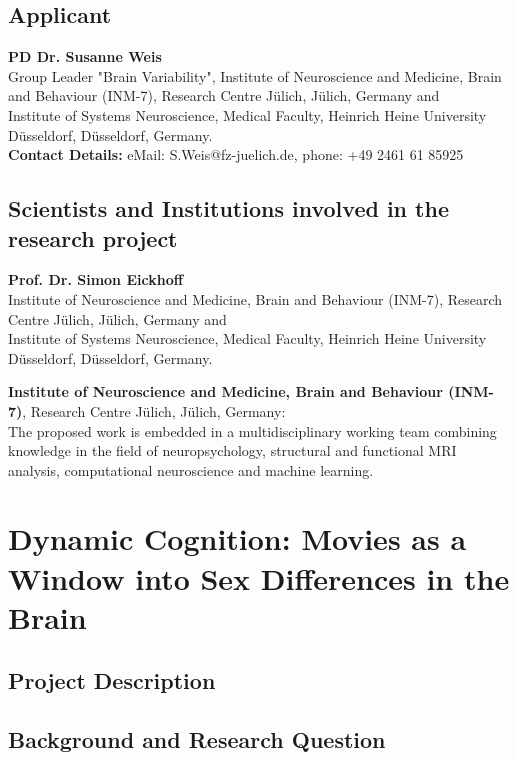 \documentclass[11pt,a4paper]{article}
\begin{document}
\subsection*{Applicant} 
\vspace{1ex}
\textbf{PD Dr. Susanne Weis}\\
Group Leader "Brain Variability", Institute of Neuroscience and Medicine, Brain and Behaviour (INM-7), Research Centre Jülich, Jülich, Germany and \\
Institute of Systems Neuroscience, Medical Faculty, Heinrich Heine University Düsseldorf, Düsseldorf, Germany. \\
\textbf{Contact Details:} eMail: S.Weis@fz-juelich.de, phone: +49 2461 61 85925\\

\subsection*{Scientists and Institutions involved in the research project}
\vspace{1ex}
\textbf{Prof. Dr. Simon Eickhoff}\\
Institute of Neuroscience and Medicine, Brain and Behaviour (INM-7), Research Centre Jülich, Jülich, Germany and \\
Institute of Systems Neuroscience, Medical Faculty, Heinrich Heine University Düsseldorf, Düsseldorf, Germany. 

\textbf{Institute of Neuroscience and Medicine, Brain and Behaviour (INM-7)}, Research Centre Jülich, 
Jülich, Germany: \\
The proposed work is embedded in a multidisciplinary working team combining knowledge in the field of neuropsychology, structural and functional MRI analysis, 
computational neuroscience and machine learning. 


\newpage

\section*{\Large\textbf{Dynamic Cognition: Movies as a Window into Sex Differences in the Brain}}
\hfill

\subsection*{Project Description} 
\subsection*{Background and Research Question} 
\end{document}
